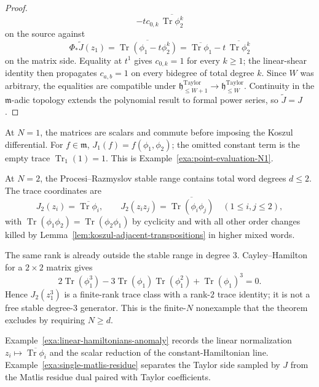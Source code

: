 \documentclass[11pt]{memoir}
\begin{document}
\begin{proof}
\[       -tc_{0,k}\,\overline{\operatorname{Tr}\phi_2^k}
  \]
  on the source against
  \[
    \Phi_*\widetilde J(z_1)
     =\overline{\operatorname{Tr}(\phi_1-t\phi_2^k)}
     =\overline{\operatorname{Tr}\phi_1}
       -t\,\overline{\operatorname{Tr}\phi_2^k}
  \]
  on the matrix side.  Equality at \(t^1\) gives \(c_{0,k}=1\) for
  every \(k\geq 1\); the linear-shear identity then propagates
  \(c_{a,b}=1\) on every bidegree of total degree \(k\).  Since \(W\)
  was arbitrary, the equalities are compatible under
  \(\mathfrak h^{\mathrm{Taylor}}_{\leq W+1}
  \to\mathfrak h^{\mathrm{Taylor}}_{\leq W}\).  Continuity in the
  \(\mathfrak m\)-adic topology extends the polynomial result to formal
  power series, so \(\widetilde J=J\).
\end{proof}

\begin{rmk}\label{rmk:Jf-uniqueness-running-examples}
  At \(N=1\), the matrices are scalars and commute before imposing the
  Koszul differential.  For \(f\in\mathfrak m\),
  \(J_1(f)=f(\phi_1,\phi_2)\); the omitted constant term is the empty
  trace \(\operatorname{Tr}_1(1)=1\).  This is
  Example~\ref{exa:point-evaluation-N1}.

  At \(N=2\), the Procesi--Razmyslov stable range contains total word
  degrees \(d\leq2\).  The trace coordinates are
  \[
    J_2(z_i)=\overline{\operatorname{Tr}\phi_i},\qquad
    J_2(z_i z_j)=\overline{\operatorname{Tr}(\phi_i\phi_j)}
    \quad(1\leq i,j\leq2),
  \]
  with \(\operatorname{Tr}(\phi_1\phi_2)=
  \operatorname{Tr}(\phi_2\phi_1)\) by cyclicity and with all other
  order changes killed by Lemma~\ref{lem:koszul-adjacent-transpositions}
  in higher mixed words.

  The same rank is already outside the stable range in degree \(3\).
  Cayley--Hamilton for a \(2\times2\) matrix gives
  \[
    2\operatorname{Tr}(\phi_1^3)
    -3\operatorname{Tr}(\phi_1)\operatorname{Tr}(\phi_1^2)
    +\operatorname{Tr}(\phi_1)^3=0.
  \]
  Hence \(J_2(z_1^3)\) is a finite-rank trace class with a rank-\(2\)
  trace identity; it is not a free stable degree-\(3\) generator.  This
  is the finite-\(N\) nonexample that the theorem excludes by requiring
  \(N\geq d\).

  Example~\ref{exa:linear-hamiltonians-anomaly} records the linear
  normalization \(z_i\mapsto\overline{\operatorname{Tr}\phi_i}\) and the
  scalar reduction of the constant-Hamiltonian line.
  Example~\ref{exa:single-matlis-residue} separates the Taylor side
  sampled by \(J\) from the Matlis residue dual paired with Taylor
  coefficients.
\end{rmk}
\end{document}
